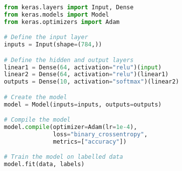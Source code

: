 \begin{lstlisting}[float={ht},caption={A small code snippet defining a simple full connected ANN with an input of a 1D tensor of length 784, two hidden layers both containing 64 units with ReLU actiation functions, and an output layer containing 10 units using the softmax activation function. The network is then trained using the Keras implementation of the Adam optimiser to minimise the binary cross-entropy loss.},label={lst:keras},language=Python,upquote=true]
from keras.layers import Input, Dense
from keras.models import Model
from keras.optimizers import Adam

# Define the input layer
inputs = Input(shape=(784,))

# Define the hidden and output layers
linear1 = Dense(64, activation="relu")(input)
linear2 = Dense(64, activation="relu")(linear1)
outputs = Dense(10, activation="softmax")(linear2)

# Create the model
model = Model(inputs=inputs, outputs=outputs)

# Compile the model
model.compile(optimizer=Adam(lr=1e-4),
              loss="binary_crossentropy",
              metrics=["accuracy"])

# Train the model on labelled data
model.fit(data, labels)
\end{lstlisting}